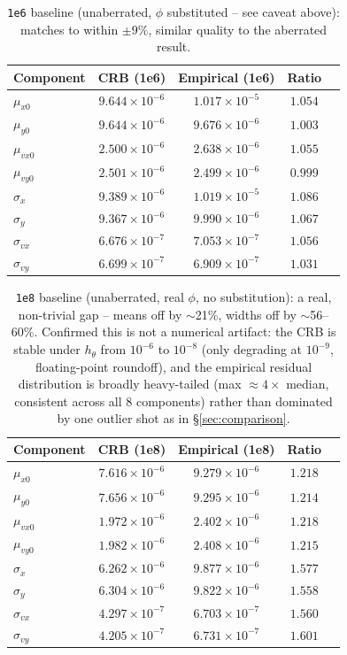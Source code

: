 \documentclass[11pt,a4paper]{article}
\newcommand{\code}[1]{\texttt{#1}}
\begin{document}
\begin{table}[h]
\centering
\begin{tabular}{lcccc}
\toprule
Component & CRB (1e6) & Empirical (1e6) & Ratio & \\
\midrule
$\mu_{x0}$    & $9.644\times10^{-6}$ & $1.017\times10^{-5}$ & $1.054$ & \\
$\mu_{y0}$    & $9.644\times10^{-6}$ & $9.676\times10^{-6}$ & $1.003$ & \\
$\mu_{vx0}$   & $2.500\times10^{-6}$ & $2.638\times10^{-6}$ & $1.055$ & \\
$\mu_{vy0}$   & $2.501\times10^{-6}$ & $2.499\times10^{-6}$ & $0.999$ & \\
$\sigma_x$    & $9.389\times10^{-6}$ & $1.019\times10^{-5}$ & $1.086$ & \\
$\sigma_y$    & $9.367\times10^{-6}$ & $9.990\times10^{-6}$ & $1.067$ & \\
$\sigma_{vx}$ & $6.676\times10^{-7}$ & $7.053\times10^{-7}$ & $1.056$ & \\
$\sigma_{vy}$ & $6.699\times10^{-7}$ & $6.909\times10^{-7}$ & $1.031$ & \\
\bottomrule
\end{tabular}
\caption{\code{1e6} baseline (unaberrated, $\phi$ substituted -- see caveat
above): matches to within $\pm9\%$, similar quality to the aberrated
result.}
\end{table}

\begin{table}[h]
\centering
\begin{tabular}{lcccc}
\toprule
Component & CRB (1e8) & Empirical (1e8) & Ratio & \\
\midrule
$\mu_{x0}$    & $7.616\times10^{-6}$ & $9.279\times10^{-6}$ & $1.218$ & \\
$\mu_{y0}$    & $7.656\times10^{-6}$ & $9.295\times10^{-6}$ & $1.214$ & \\
$\mu_{vx0}$   & $1.972\times10^{-6}$ & $2.402\times10^{-6}$ & $1.218$ & \\
$\mu_{vy0}$   & $1.982\times10^{-6}$ & $2.408\times10^{-6}$ & $1.215$ & \\
$\sigma_x$    & $6.262\times10^{-6}$ & $9.877\times10^{-6}$ & $\mathbf{1.577}$ & \\
$\sigma_y$    & $6.304\times10^{-6}$ & $9.822\times10^{-6}$ & $\mathbf{1.558}$ & \\
$\sigma_{vx}$ & $4.297\times10^{-7}$ & $6.703\times10^{-7}$ & $\mathbf{1.560}$ & \\
$\sigma_{vy}$ & $4.205\times10^{-7}$ & $6.731\times10^{-7}$ & $\mathbf{1.601}$ & \\
\bottomrule
\end{tabular}
\caption{\code{1e8} baseline (unaberrated, real $\phi$, no substitution): a
real, non-trivial gap -- means off by $\sim$21\%, widths off by
$\sim$56--60\%. Confirmed this is not a numerical artifact: the CRB is
stable under $h_\theta$ from $10^{-6}$ to $10^{-8}$ (only degrading at
$10^{-9}$, floating-point roundoff), and the empirical residual distribution
is broadly heavy-tailed (max $\approx4\times$ median, consistent across all
8 components) rather than dominated by one outlier shot as in
\S\ref{sec:comparison}.}
\end{table}
\end{document}
